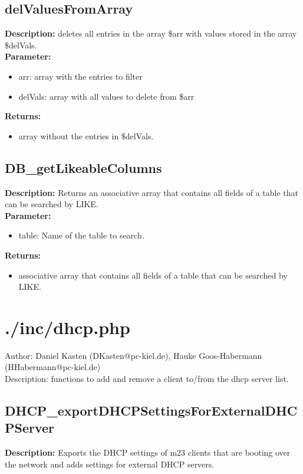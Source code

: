 \subsection{delValuesFromArray}
\textbf{Description:} deletes all entries in the array \$arr with values stored in the array \$delVals.\\
\textbf{Parameter:}
\begin{itemize}
\item arr: array with the entries to filter
\item delVals: array with all values to delete from \$arr
\end{itemize}
\textbf{Returns:}
\begin{itemize}
\item array without the entries in \$delVals.
\end{itemize}

\subsection{DB\_getLikeableColumns}
\textbf{Description:} Returns an associative array that contains all fields of a table that can be searched by LIKE.\\
\textbf{Parameter:}
\begin{itemize}
\item table: Name of the table to search.
\end{itemize}
\textbf{Returns:}
\begin{itemize}
\item associative array that contains all fields of a table that can be searched by LIKE.
\end{itemize}

\newpage\section{./inc/dhcp.php}
 Author: Daniel Kasten (DKasten@pc-kiel.de), Hauke Goos-Habermann (HHabermann@pc-kiel.de)\\
 Description: functions to add and remove a client to/from the dhcp server list.\\

\subsection{DHCP\_exportDHCPSettingsForExternalDHCPServer}
\textbf{Description:} Exports the DHCP settings of m23 clients that are booting over the network and adds settings for external DHCP servers.\\

